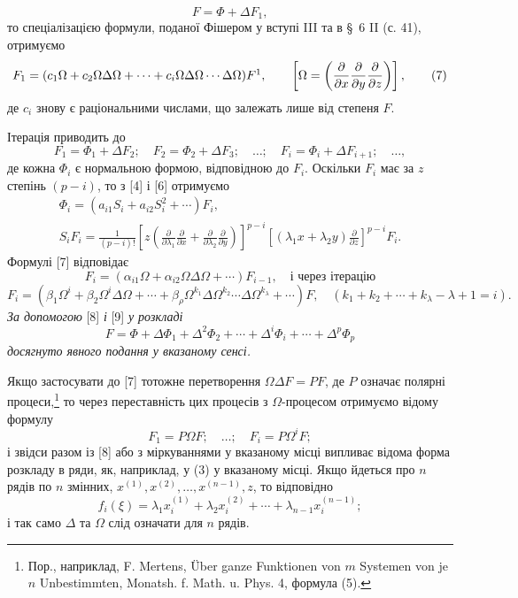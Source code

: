 \documentclass[11pt]{article}
\providecommand{\p}{\partial}
\begin{document}
\begin{equation}
        F=\Phi+\Delta F_1,
\tag{2a}
\end{equation}
то спеціалізацією формули, поданої Фішером у вступі III та в \S~6 II (с. 41), отримуємо
\begin{equation}
        F_1=(c_1\Omega+c_2\Omega\Delta\Omega+\cdots+c_i\Omega\Delta\Omega\cdots\Delta\Omega)F\footnotemark,
        \qquad \left[\Omega=\left(\frac{\p}{\p x}\frac{\p}{\p y}\frac{\p}{\p z}\right)\right],
\tag{7}
\end{equation}
де \(c_i\) знову є раціональними числами, що залежать лише від степеня \(F\).

Ітерація приводить до
\[
        F_1=\Phi_1+\Delta F_2;\quad F_2=\Phi_2+\Delta F_3;\quad\ldots;\quad
        F_i=\Phi_i+\Delta F_{i+1};\quad\ldots,
\]
де кожна \(\Phi_i\) є нормальною формою, відповідною до \(F_i\). Оскільки \(F_i\) має за \(z\) степінь \((p-i)\), то з [4] і [6] отримуємо
\begin{equation}
\begin{gathered}
        \Phi_i=(a_{i1}S_i+a_{i2}S_i^2+\cdots)F_i,\\
        S_iF_i=\frac1{(p-i)!}
        \left[z\left(\frac{\p}{\p\lambda_1}\frac{\p}{\p x}+
        \frac{\p}{\p\lambda_2}\frac{\p}{\p y}\right)\right]^{p-i}
        \left[(\lambda_1x+\lambda_2y)\frac{\p}{\p z}\right]^{p-i}F_i.
\end{gathered}
\tag{8}
\end{equation}
Формулі [7] відповідає
\[
        F_i=(\alpha_{i1}\Omega+\alpha_{i2}\Omega\Delta\Omega+\cdots)F_{i-1},
        \quad\text{і через ітерацію}
\]
\begin{equation}
        F_i=(\beta_1\Omega^i+\beta_2\Omega^i\Delta\Omega+\cdots
        +\beta_\rho\Omega^{k_1}\Delta\Omega^{k_2}\cdots\Delta\Omega^{k_\lambda}+\cdots)F,
        \quad(k_1+k_2+\cdots+k_\lambda-\lambda+1=i).
\tag{9}
\end{equation}
\emph{За допомогою} [8] \emph{і} [9] \emph{у розкладі}
\[
        F=\Phi+\Delta\Phi_1+\Delta^2\Phi_2+\cdots+\Delta^i\Phi_i+\cdots+\Delta^p\Phi_p
\]
\emph{досягнуто явного подання у вказаному сенсі.}

Якщо застосувати до [7] тотожне перетворення \(\Omega\Delta F=PF\), де \(P\) означає полярні процеси,\footnote{Пор., наприклад, F. Mertens, Über ganze Funktionen von \(m\) Systemen von je \(n\) Unbestimmten, Monatsh. f. Math. u. Phys. 4, формула (5).} то через переставність цих процесів з \(\Omega\)-процесом отримуємо відому формулу
\[
        F_1=P\Omega F;\quad\ldots;\quad F_i=P\Omega^iF;
\]
і звідси разом із [8] або з міркуваннями у вказаному місці випливає відома форма розкладу в ряди, як, наприклад, у (3) у вказаному місці. Якщо йдеться про \(n\) рядів по \(n\) змінних, \(x^{(1)},x^{(2)},\ldots,x^{(n-1)},z\), то відповідно
\[
        f_i(\xi)=\lambda_1x_i^{(1)}+\lambda_2x_i^{(2)}+\cdots+\lambda_{n-1}x_i^{(n-1)};
\]
і так само \(\Delta\) та \(\Omega\) слід означати для \(n\) рядів.
\end{document}
